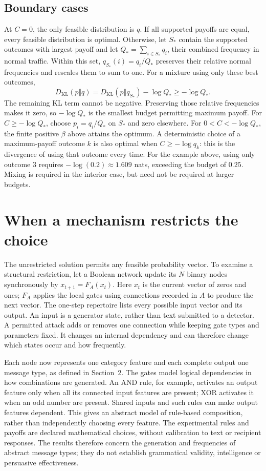 \documentclass[11pt,a4paper]{article}
\newcommand{\KL}{D_{\mathrm{KL}}}
\begin{document}
\subsection{Boundary cases}
At $C=0$, the only feasible distribution is $q$. If all supported payoffs
are equal, every feasible distribution is optimal. Otherwise, let $S_*$
contain the supported outcomes with largest payoff and let
$Q_*=\sum_{i\in S_*}q_i$, their combined frequency in normal traffic.
Within this set, $q_{S_*}(i)=q_i/Q_*$ preserves their relative normal
frequencies and rescales them to sum to one. For a mixture using only
these best outcomes,
\[
 \KL(p\Vert q)=\KL(p\Vert q_{S_*})-\log Q_*\geq-\log Q_*.
\]
The remaining KL term cannot be negative. Preserving those relative
frequencies makes it zero, so $-\log Q_*$ is the smallest budget
permitting maximum payoff.
For $C\geq-\log Q_*$, choose $p_i=q_i/Q_*$ on $S_*$ and zero elsewhere.
For $0<C<-\log Q_*$, the finite positive $\beta$ above attains the optimum.
A deterministic choice of a maximum-payoff outcome $k$ is also optimal
when $C\geq-\log q_k$: this is the divergence of using that outcome
every time. For the example above, using only outcome 3 requires
$-\log(0.2)\approx1.609$ nats, exceeding the budget of $0.25$.
Mixing is required in the interior case, but need not be required at
larger budgets.

\section{When a mechanism restricts the choice}
The unrestricted solution permits any feasible probability vector.
To examine a structural restriction, let a Boolean network update its
$N$ binary nodes synchronously by $x_{t+1}=F_A(x_t)$. Here $x_t$ is
the current vector of zeros and ones; $F_A$ applies the local gates
using connections recorded in $A$ to produce the next vector.
The one-step repertoire lists every possible input vector and its output.
An input is a generator state, rather than text submitted to a detector.
A permitted attack adds or removes one connection while keeping gate
types and parameters fixed. It changes an internal dependency and can
therefore change which states occur and how frequently.

Each node now represents one category feature and each complete output
one message type, as defined in Section~2. The gates model logical
dependencies in how combinations are generated. An AND rule, for example,
activates an output feature only when all its connected input features
are present; XOR activates it when an odd number are present. Shared
inputs and such rules can make output features dependent. This gives an
abstract model of rule-based composition, rather than independently
choosing every feature. The experimental rules and payoffs are declared
mathematical choices, without calibration to text or recipient responses.
The results therefore concern the generation and frequencies of abstract
message types; they do not establish grammatical validity, intelligence
or persuasive effectiveness.
\end{document}
